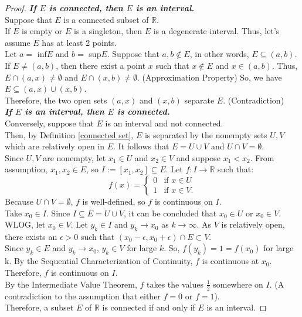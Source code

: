 \documentclass[12pt, reqno]{amsart}
\theoremstyle{definition}
\numberwithin{equation}{section}
\newcommand{\dR}{{\mathbb R}}
\newcommand{\tabb}{\hspace*{1cm}}
\begin{document}
\begin{proof}
    \textbf{\textit{If $E$ is connected, then $E$ is an interval.}}\\
    Suppose that $E$ is a connected subset of $\dR$.\\
    If $E$ is empty or $E$ is a singleton, then $E$ is a degenerate interval. Thus, let's assume $E$ has at least 2 points.\\
    Let $a =$ inf$E$ and $b =$ sup$E$. Suppose that $a,b \notin E$, in other words, $E \subseteq (a,b)$.\\
    If $E \not= (a,b)$, then there exist a point $x$ such that $x \notin E$ and $x \in (a,b)$. Thus, $E \cap (a,x) \not= \emptyset$ and $E \cap (x,b) \not= \emptyset$. (Approximation Property) So, we have $E \subseteq (a,x) \cup (x,b)$.\\
    Therefore, the two open sets $(a,x)$ and $(x,b)$ separate $E$. (Contradiction)\\ 
    \textbf{\textit{If $E$ is an interval, then $E$ is connected.}}\\
    Conversely, suppose that $E$ is an interval and not connected.\\
    Then, by Definition \ref{connected set}, $E$ is separated by the nonempty sets $U,V$ which are relatively open in $E.$ It follows that $E=U \cup V$ and $U \cap V = \emptyset$.\\
    Since $U, V$ are nonempty, let $x_1 \in U$ and $x_2 \in V$ and suppose $x_1 < x_2$. From assumption, $x_1, x_2 \in E$, so $I := [x_1,x_2] \subseteq E$. Let $f: I \rightarrow \dR$ such that:\\
    \begin{equation}
        f(x)=
        \begin{cases}
            0 & \text{if } x \in U\\
            1 & \text{if } x \in V.
        \end{cases}
    \end{equation}
    Because $U \cap V = \emptyset$, $f$ is well-defined, so $f$ is continuous on $I$.\\
    Take $x_0 \in I$. Since $I \subseteq E = U \cup V$, it can be concluded that $x_0 \in U$ or $x_0 \in V$.\\
    WLOG, let $x_0 \in V$. Let $y_k \in I$ and $y_k \rightarrow x_0$ as $k \rightarrow \infty$. As $V$ is relatively open, there exists an $\epsilon >0$ such that $(x_0 - \epsilon, x_0 + \epsilon) \cap E \subset V$.\\
    Since $y_k \in E$ and $y_k \rightarrow x_0$, $y_k \in V$ for large $k$. So, $f(y_k)=1=f(x_0)$ for large k. By the Sequential Characterization of Continuity, $f$ is continuous at $x_0$.\\
    Therefore, $f$ is continuous on $I$.\\
    By the Intermediate Value Theorem, $f$ takes the values $\frac{1}{2}$ somewhere on $I$. (A contradiction to the assumption that either $f=0$ or $f=1$).\\
    \tabb Therefore, a subset $E$ of $\dR$ is connected if and only if $E$ is an interval.
\end{proof}
\end{document}
